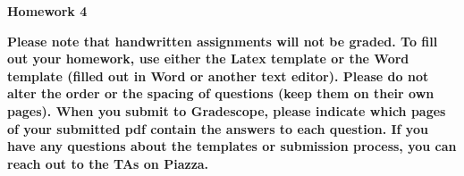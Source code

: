 \documentclass[12pt]{article}
\date{}
\begin{document}
\begin{flushleft}
\large \bf
Homework 4 \\
\end{flushleft}
{\bf
Please note that handwritten assignments will not be graded. To fill out your homework, use either the Latex template or the Word template (filled out in Word or another text editor). Please do not alter the order or the spacing of questions (keep them on their own pages). When you submit to Gradescope, please indicate which pages of your submitted pdf contain the answers to each question. If you have any questions about the templates or submission process, you can reach out to the TAs on Piazza.
}
\end{document}
